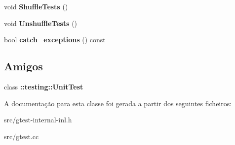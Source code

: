 \begin{DoxyCompactItemize}
\item 
\hypertarget{classtesting_1_1internal_1_1UnitTestImpl_aaaa38e6a4372e6bb9bbe3143a3a32b65}{void {\bfseries Shuffle\-Tests} ()}\label{classtesting_1_1internal_1_1UnitTestImpl_aaaa38e6a4372e6bb9bbe3143a3a32b65}

\item 
\hypertarget{classtesting_1_1internal_1_1UnitTestImpl_a1ee7db3bf8284dd9dce4dc857564bce3}{void {\bfseries Unshuffle\-Tests} ()}\label{classtesting_1_1internal_1_1UnitTestImpl_a1ee7db3bf8284dd9dce4dc857564bce3}

\item 
\hypertarget{classtesting_1_1internal_1_1UnitTestImpl_a0bbc6e237776ee6afaee106fe83e0406}{bool {\bfseries catch\-\_\-exceptions} () const }\label{classtesting_1_1internal_1_1UnitTestImpl_a0bbc6e237776ee6afaee106fe83e0406}

\end{DoxyCompactItemize}
\subsection*{Amigos}
\begin{DoxyCompactItemize}
\item 
\hypertarget{classtesting_1_1internal_1_1UnitTestImpl_a893404438388dec058dc5c02e8f9a014}{class {\bfseries \-::testing\-::\-Unit\-Test}}\label{classtesting_1_1internal_1_1UnitTestImpl_a893404438388dec058dc5c02e8f9a014}

\end{DoxyCompactItemize}


A documentação para esta classe foi gerada a partir dos seguintes ficheiros\-:\begin{DoxyCompactItemize}
\item 
src/gtest-\/internal-\/inl.\-h\item 
src/gtest.\-cc\end{DoxyCompactItemize}
